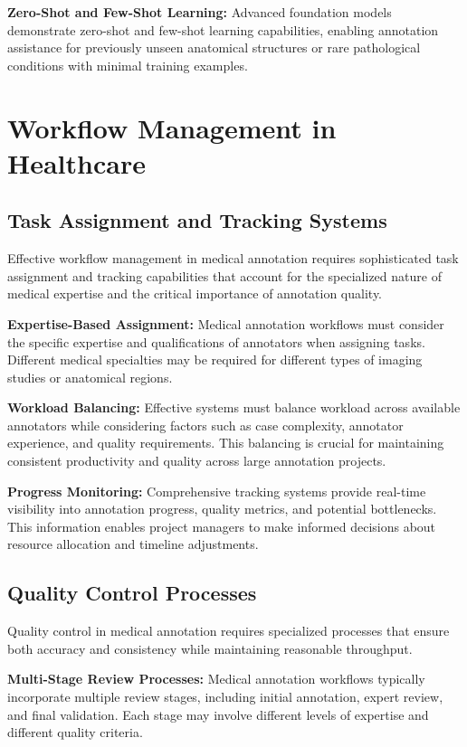 \textbf{Zero-Shot and Few-Shot Learning:} Advanced foundation models demonstrate zero-shot and few-shot learning capabilities, enabling annotation assistance for previously unseen anatomical structures or rare pathological conditions with minimal training examples.

\section{Workflow Management in Healthcare}

\subsection{Task Assignment and Tracking Systems}

Effective workflow management in medical annotation requires sophisticated task assignment and tracking capabilities that account for the specialized nature of medical expertise and the critical importance of annotation quality.

\textbf{Expertise-Based Assignment:} Medical annotation workflows must consider the specific expertise and qualifications of annotators when assigning tasks. Different medical specialties may be required for different types of imaging studies or anatomical regions.

\textbf{Workload Balancing:} Effective systems must balance workload across available annotators while considering factors such as case complexity, annotator experience, and quality requirements. This balancing is crucial for maintaining consistent productivity and quality across large annotation projects.

\textbf{Progress Monitoring:} Comprehensive tracking systems provide real-time visibility into annotation progress, quality metrics, and potential bottlenecks. This information enables project managers to make informed decisions about resource allocation and timeline adjustments.

\subsection{Quality Control Processes}

Quality control in medical annotation requires specialized processes that ensure both accuracy and consistency while maintaining reasonable throughput.

\textbf{Multi-Stage Review Processes:} Medical annotation workflows typically incorporate multiple review stages, including initial annotation, expert review, and final validation. Each stage may involve different levels of expertise and different quality criteria.

